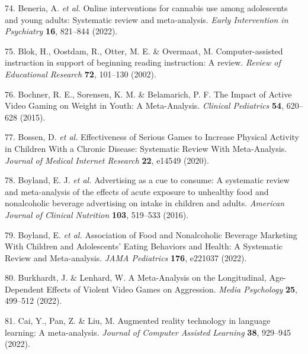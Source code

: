 \documentclass[
  english,
  man]{apa6}
\newenvironment{cslreferences}%
  {}%
  {\par}
\begin{document}
\begin{cslreferences}
\leavevmode\hypertarget{ref-beneriaOnlineInterventionsCannabis2021}{}%
74. Beneria, A. \emph{et al.} Online interventions for cannabis use among adolescents and young adults: Systematic review and meta-analysis. \emph{Early Intervention in Psychiatry} \textbf{16}, 821--844 (2022).

\leavevmode\hypertarget{ref-blokComputerassistedInstructionSupport2002}{}%
75. Blok, H., Oostdam, R., Otter, M. E. \& Overmaat, M. Computer-assisted instruction in support of beginning reading instruction: A review. \emph{Review of Educational Research} \textbf{72}, 101--130 (2002).

\leavevmode\hypertarget{ref-bochnerImpactActiveVideo2015}{}%
76. Bochner, R. E., Sorensen, K. M. \& Belamarich, P. F. The Impact of Active Video Gaming on Weight in Youth: A Meta-Analysis. \emph{Clinical Pediatrics} \textbf{54}, 620--628 (2015).

\leavevmode\hypertarget{ref-bossenEffectivenessSeriousGames2020}{}%
77. Bossen, D. \emph{et al.} Effectiveness of Serious Games to Increase Physical Activity in Children With a Chronic Disease: Systematic Review With Meta-Analysis. \emph{Journal of Medical Internet Research} \textbf{22}, e14549 (2020).

\leavevmode\hypertarget{ref-boylandAdvertisingCueConsume2016}{}%
78. Boyland, E. J. \emph{et al.} Advertising as a cue to consume: A systematic review and meta-analysis of the effects of acute exposure to unhealthy food and nonalcoholic beverage advertising on intake in children and adults. \emph{American Journal of Clinical Nutrition} \textbf{103}, 519--533 (2016).

\leavevmode\hypertarget{ref-boylandAssociationFoodNonalcoholic2022}{}%
79. Boyland, E. \emph{et al.} Association of Food and Nonalcoholic Beverage Marketing With Children and Adolescents' Eating Behaviors and Health: A Systematic Review and Meta-analysis. \emph{JAMA Pediatrics} \textbf{176}, e221037 (2022).

\leavevmode\hypertarget{ref-burkhardtMetaAnalysisLongitudinalAgeDependent2022}{}%
80. Burkhardt, J. \& Lenhard, W. A Meta-Analysis on the Longitudinal, Age-Dependent Effects of Violent Video Games on Aggression. \emph{Media Psychology} \textbf{25}, 499--512 (2022).

\leavevmode\hypertarget{ref-caiAugmentedRealityTechnology2022}{}%
81. Cai, Y., Pan, Z. \& Liu, M. Augmented reality technology in language learning: A meta-analysis. \emph{Journal of Computer Assisted Learning} \textbf{38}, 929--945 (2022).


\end{cslreferences}
\end{document}
